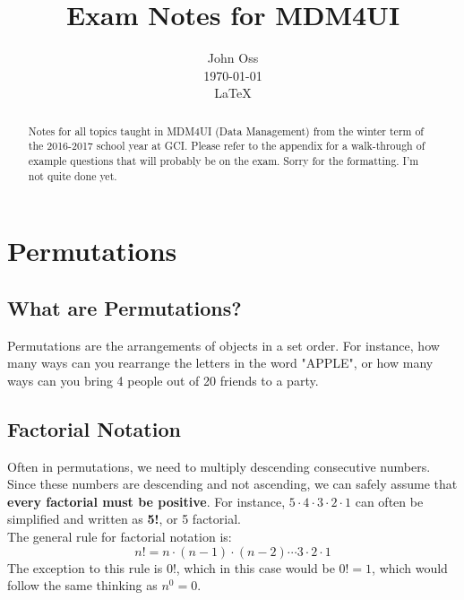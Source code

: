\documentclass[final,1p,12pt]{elsarticle}
\begin{document}
\begin{frontmatter}
    \title{Exam Notes for MDM4UI}
    \author{John Oss\\
            \today\\
            \LaTeX}
    
    \begin{abstract}
        Notes for all topics taught in MDM4UI (Data Management) from the winter term of the 2016-2017 school year at GCI.  
        Please refer to the appendix for a walk-through of example questions that will probably be on the exam. 
        Sorry for the formatting. I'm not quite done yet.
    \end{abstract}
\end{frontmatter}

\section{Permutations}

    \subsection{What are Permutations?}
    Permutations are the arrangements of objects in a set order. 
    For instance, how many ways can you rearrange the letters in the word "APPLE",
    or how many ways can you bring 4 people out of 20 friends to a party.

    \subsection{Factorial Notation}
    Often in permutations, we need to multiply descending consecutive numbers.
    Since these numbers are descending and not ascending, we can safely assume that \textbf{every factorial must be positive}. 
    For instance,  $5\cdot4\cdot3\cdot2\cdot1$ can often be simplified and written as \textbf{5!}, or 5 factorial.\\
    The general rule for factorial notation is: 
    \begin{equation*}%
        n! = n\cdot(n-1)\cdot(n-2)\cdots3\cdot2\cdot1
    \end{equation*}
    The exception to this rule is 0!, which in this case would be $0! = 1$, which would follow the same thinking as $n^0=0$.
    
\end{document}

